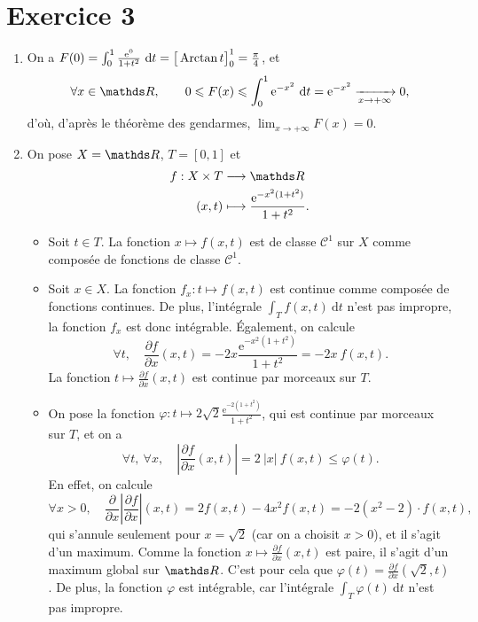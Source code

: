 \section{Exercice 3}

\begin{enumerate}
	\item On a $F(0) = \int_{0}^{1} \frac{\mathrm{e}^{0}}{1+t^2}~\mathrm{d}t = \big[\operatorname{Arctan} t\big]_0^1 = \frac{\pi}{4}$, et \[
			\forall x \in \R,\qquad 0 \le F(x) \le \int_{0}^{1} \mathrm{e}^{-x^2}~\mathrm{d}t = \mathrm{e}^{-x^2} \tendsto{x\to +\infty} 0,
		\] d'où, d'après le théorème des gendarmes, $\lim_{x\to +\infty} F(x) = 0$.
	\item On pose $X = \R$, $T = [0,1]$\/ et \begin{align*}
			f: X \times T &\longrightarrow \R \\
			(x,t) &\longmapsto \frac{\mathrm{e}^{-x^2(1+t^2)}}{1+t^2}.
		\end{align*}
		\begin{itemize}
			\item Soit $t \in T$. La fonction $x \mapsto f(x,t)$\/ est de classe $\mathcal{C}^1$\/ sur $X$\/ comme composée de fonctions de classe $\mathcal{C}^1$.
			\item Soit $x \in X$. La fonction $f_x :t \mapsto f(x,t)$\/ est continue comme composée de fonctions continues. De plus, l'intégrale $\int_{T} f(x,t)~\mathrm{d}t$\/ n'est pas impropre, la fonction $f_x$\/ est donc intégrable. Également, on calcule
				\[
					\forall t,\quad\frac{\partial f}{\partial x}(x,t) = -2x \frac{\mathrm{e}^{-x^2(1+t^2)}}{1+t^2} = -2x\:f(x,t).
				\] La fonction $t \mapsto \frac{\partial f}{\partial x}(x,t)$\/ est continue par morceaux sur $T$.
			\item On pose la fonction $\varphi : t \mapsto 2\sqrt{2} \frac{\mathrm{e}^{-2(1+t^2)}}{1+t^2}$, qui est continue par morceaux sur $T$, et on a \[
				\forall t,\:\forall x,\quad \left| \frac{\partial f}{\partial x}(x,t) \right| = 2\:|x|\: f(x,t) \le \varphi(t)
			.\]
			En effet, on calcule \[
				\forall x > 0,\quad \frac{\partial}{\partial x} \left| \frac{\partial f}{\partial x} \right|(x,t) = 2f(x,t) - 4x^2 f(x,t) = -2(x^2 - 2)\cdot f(x,t),
			\] qui s'annule seulement pour $x = \sqrt{2}$\/ (car on a choisit $x > 0$), et il s'agit d'un maximum. Comme la fonction $x \mapsto \frac{\partial f}{\partial x}(x,t)$\/ est paire, il s'agit d'un maximum global sur $\R$. C'est pour cela que $\varphi(t) = \frac{\partial f}{\partial x}(\sqrt{2}, t)$.
			De plus, la fonction $\varphi$\/ est intégrable, car l'intégrale $\int_{T} \varphi(t)~\mathrm{d}t$\/ n'est pas impropre.

\end{itemize}
\end{enumerate}
